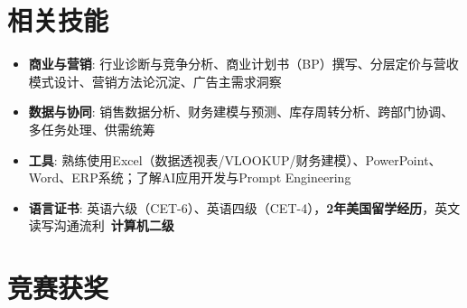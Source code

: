 \documentclass{resume}
\begin{document}
\section{相关技能}
\begin{itemize}[parsep=0.2ex]
  \item \textbf{商业与营销}: 行业诊断与竞争分析、商业计划书（BP）撰写、分层定价与营收模式设计、营销方法论沉淀、广告主需求洞察
  \item \textbf{数据与协同}: 销售数据分析、财务建模与预测、库存周转分析、跨部门协调、多任务处理、供需统筹
  \item \textbf{工具}: 熟练使用Excel（数据透视表/VLOOKUP/财务建模）、PowerPoint、Word、ERP系统；了解AI应用开发与Prompt Engineering
  \item \textbf{语言证书}: 英语六级（CET-6）、英语四级（CET-4），\textbf{2年美国留学经历}，英文读写沟通流利\textperiodcentered\ \textbf{计算机二级}
\end{itemize}

\section{竞赛获奖}
\end{document}
